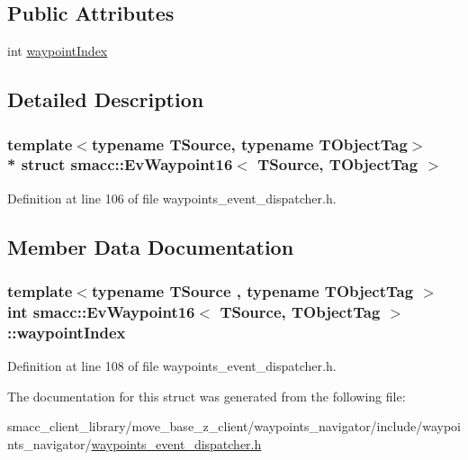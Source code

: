 \subsection*{Public Attributes}
\begin{DoxyCompactItemize}
\item 
int \hyperlink{structsmacc_1_1EvWaypoint16_a2faf08a55ae39ab5fdb024ffef384925}{waypoint\+Index}
\end{DoxyCompactItemize}


\subsection{Detailed Description}
\subsubsection*{template$<$typename T\+Source, typename T\+Object\+Tag$>$\\*
struct smacc\+::\+Ev\+Waypoint16$<$ T\+Source, T\+Object\+Tag $>$}



Definition at line 106 of file waypoints\+\_\+event\+\_\+dispatcher.\+h.



\subsection{Member Data Documentation}
\subsubsection[{\texorpdfstring{waypoint\+Index}{waypointIndex}}]{\setlength{\rightskip}{0pt plus 5cm}template$<$typename T\+Source , typename T\+Object\+Tag $>$ int {\bf smacc\+::\+Ev\+Waypoint16}$<$ T\+Source, T\+Object\+Tag $>$\+::waypoint\+Index}\hypertarget{structsmacc_1_1EvWaypoint16_a2faf08a55ae39ab5fdb024ffef384925}{}\label{structsmacc_1_1EvWaypoint16_a2faf08a55ae39ab5fdb024ffef384925}


Definition at line 108 of file waypoints\+\_\+event\+\_\+dispatcher.\+h.



The documentation for this struct was generated from the following file\+:\begin{DoxyCompactItemize}
\item 
smacc\+\_\+client\+\_\+library/move\+\_\+base\+\_\+z\+\_\+client/waypoints\+\_\+navigator/include/waypoints\+\_\+navigator/\hyperlink{waypoints__event__dispatcher_8h}{waypoints\+\_\+event\+\_\+dispatcher.\+h}\end{DoxyCompactItemize}
